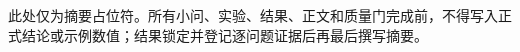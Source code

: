 \begin{competitionabstract}
此处仅为摘要占位符。所有小问、实验、结果、正文和质量门完成前，不得写入正式结论或示例数值；结果锁定并登记逐问题证据后再最后撰写摘要。

\end{competitionabstract}
